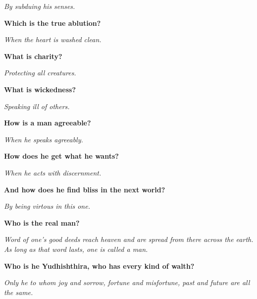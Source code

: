 \textit{By subduing his senses.}\medskip

\textbf{Which is the true ablution?}

\textit{When the heart is washed clean.}\medskip

\textbf{What is charity?}

\textit{Protecting all creatures.}\medskip

\textbf{What is wickedness?}

\textit{Speaking ill of others.}\medskip

\textbf{How is a man agreeable?}

\textit{When he speaks agreeably.}\medskip

\textbf{How does he get what he wants?}

\textit{When he acts with discernment.}\medskip

\textbf{And how does he find bliss in the next world?}

\textit{By being virtous in this one.}\medskip

\textbf{Who is the real man?}

\textit{Word of one's good deeds reach heaven and are spread from there across the earth. As long as that word lasts, one is called a man.}\medskip

\textbf{Who is he Yudhishthira, who has every kind of walth?}

\textit{Only he to whom joy and sorrow, fortune and misfortune, past and future are all the same.}\medskip
